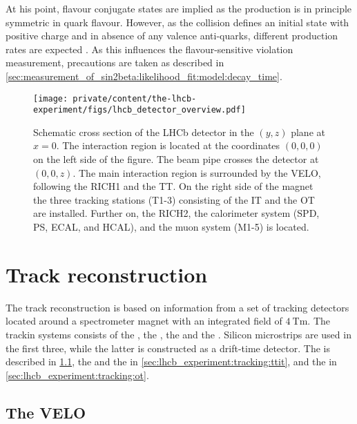At his point, flavour conjugate states are implied as the production is in
principle symmetric in quark flavour. However, as the \protonproton collision
defines an initial state with positive charge and in absence of any valence
anti-quarks, different production rates are expected
\cite{Chaichian:1993rh,Norrbin:2000zc,Norrbin:2000jy}. As this influences the
flavour-sensitive \CP violation measurement, precautions are taken as described
in \cref{sec:measurement_of_sin2beta:likelihood_fit:model:decay_time}.
%
\begin{figure}[t]
  \centering
    \texttt{[image: private/content/the-lhcb-experiment/figs/lhcb\_detector\_overview.pdf]}
  \caption{
    Schematic cross section of the \acs{LHCb} detector in the $(y,z)$ plane at
  $x=0$. The \protonproton interaction region is located at the coordinates
  $(0,0,0)$ on the left side of the figure. The beam pipe crosses the detector at
  $(0,0,z)$. The main interaction region is surrounded by the \acs*{VELO},
  following the \acs*{RICH}1 and the \acs*{TT}. On the right side of the magnet
  the three tracking stations (T1-3) consisting of the \acs*{IT} and the
  \acs*{OT} are installed. Further on, the \acs*{RICH}2, the calorimeter system
  (\acs*{SPD}, \acs*{PS}, \acs*{ECAL}, and \acs*{HCAL}), and the muon system
  (M1-5) is located. }
  \label{fig:lhcb_experiment:detector:overview}
\end{figure}

\section{Track reconstruction}
\label{sec:lhcb_experiment:tracking}

The \LHCb track reconstruction is based on information from a set of tracking
detectors located around a spectrometer magnet with an integrated field of
$\SI{4}{\tesla\metre}$. The trackin systems consists of the \VELO, the \TT, the
\IT and the \OT. Silicon microstrips are used in the first three, while the
latter is constructed as a drift-time detector. The \VELO is described in
\cref{sec:lhcb_experiment:tracking:velo}, the \TT and the \IT in
\cref{sec:lhcb_experiment:tracking:ttit}, and the \OT in
\cref{sec:lhcb_experiment:tracking:ot}.

\subsection{The \acl*{VELO}}
\label{sec:lhcb_experiment:tracking:velo}

